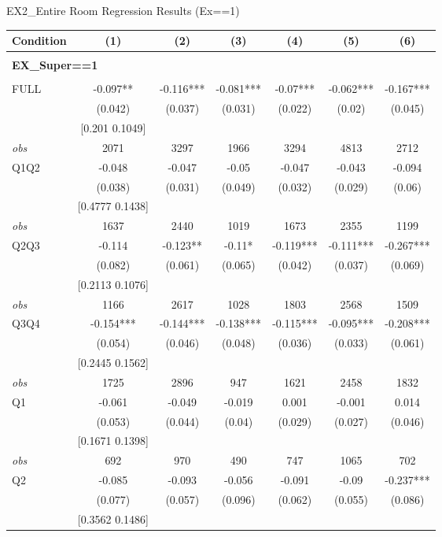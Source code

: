 \begin{table}[]
\TABLE
{EX2\_Entire Room Regression Results (Ex==1) \label{ex2_result_detail1}}{\begin{tabular}{lcccccc}
\hline
Condition & (1) & (2) & (3) & (4) & (5) & (6) \\ \hline
\\ 
\multicolumn{5}{l}{\textbf{EX\_Super==1}} \\ 
\\ 
FULL & -0.097** & -0.116*** & -0.081*** & -0.07*** & -0.062*** & -0.167*** \\ 
&(0.042)&(0.037) & (0.031)&(0.022)&(0.02)&(0.045)\\ 
& [0.201 0.1049] & & & & & \\ 
\textit{obs} & 2071 & 3297 & 1966 & 3294 & 4813 & 2712 \\ 
Q1Q2 & -0.048 & -0.047 & -0.05 & -0.047 & -0.043 & -0.094 \\ 
&(0.038)&(0.031) & (0.049)&(0.032)&(0.029)&(0.06)\\ 
& [0.4777 0.1438] & & & & & \\ 
\textit{obs} & 1637 & 2440 & 1019 & 1673 & 2355 & 1199 \\ 
Q2Q3 & -0.114 & -0.123** & -0.11* & -0.119*** & -0.111*** & -0.267*** \\ 
&(0.082)&(0.061) & (0.065)&(0.042)&(0.037)&(0.069)\\ 
& [0.2113 0.1076] & & & & & \\ 
\textit{obs} & 1166 & 2617 & 1028 & 1803 & 2568 & 1509 \\ 
Q3Q4 & -0.154*** & -0.144*** & -0.138*** & -0.115*** & -0.095*** & -0.208*** \\ 
&(0.054)&(0.046) & (0.048)&(0.036)&(0.033)&(0.061)\\ 
& [0.2445 0.1562] & & & & & \\ 
\textit{obs} & 1725 & 2896 & 947 & 1621 & 2458 & 1832 \\ 
Q1 & -0.061 & -0.049 & -0.019 & 0.001 & -0.001 & 0.014 \\ 
&(0.053)&(0.044) & (0.04)&(0.029)&(0.027)&(0.046)\\ 
& [0.1671 0.1398] & & & & & \\ 
\textit{obs} & 692 & 970 & 490 & 747 & 1065 & 702 \\ 
Q2 & -0.085 & -0.093 & -0.056 & -0.091 & -0.09 & -0.237*** \\ 
&(0.077)&(0.057) & (0.096)&(0.062)&(0.055)&(0.086)\\ 
& [0.3562 0.1486] & & & & & \\ 

\end{tabular}}
\end{table}
